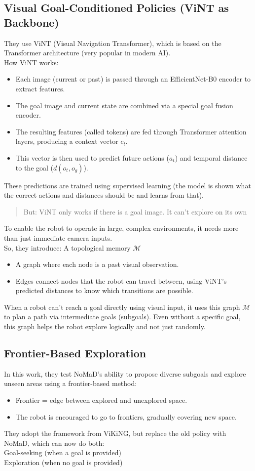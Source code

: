 \documentclass[12pt]{article}
\begin{document}
\subsection*{Visual Goal-Conditioned Policies (ViNT as Backbone)}
They use ViNT (Visual Navigation Transformer), which is based on the Transformer architecture (very popular in modern AI).\\
How ViNT works:
\begin{itemize}
    \item Each image (current or past) is passed through an EfficientNet-B0 encoder to extract features.
    \item The goal image and current state are combined via a special goal fusion encoder.
    \item The resulting features (called tokens) are fed through Transformer attention layers, producing a context vector $c_t$.
    \item This vector is then used to predict future actions ($a_t$) and temporal distance to the goal ($d(o_t, o_g)$).
\end{itemize}
These predictions are trained using supervised learning (the model is shown what the correct actions and distances should be and learns from that).\\
\begin{quote}
    But: ViNT only works if there is a goal image. It can't explore on its own
\end{quote}
To enable the robot to operate in large, complex environments, it needs more than just immediate camera inputs.\\
So, they introduce: A topological memory $\mathcal{M}$
\begin{itemize}
    \item A graph where each node is a past visual observation.
    \item Edges connect nodes that the robot can travel between, using ViNT's predicted distances to know which transitions are possible.
\end{itemize}
When a robot can’t reach a goal directly using visual input, it uses this graph $\mathcal{M}$ to plan a path via intermediate goals (subgoals).
Even without a specific goal, this graph helps the robot explore logically and not just randomly.\\
\subsection*{Frontier-Based Exploration}
In this work, they test NoMaD's ability to propose diverse subgoals and explore unseen areas using a frontier-based method:
\begin{itemize}
    \item Frontier = edge between explored and unexplored space.
    \item The robot is encouraged to go to frontiers, gradually covering new space.
\end{itemize}
They adopt the framework from ViKiNG, but replace the old policy with NoMaD, which can now do both:\\
Goal-seeking (when a goal is provided)\\
Exploration (when no goal is provided)\\
\end{document}
